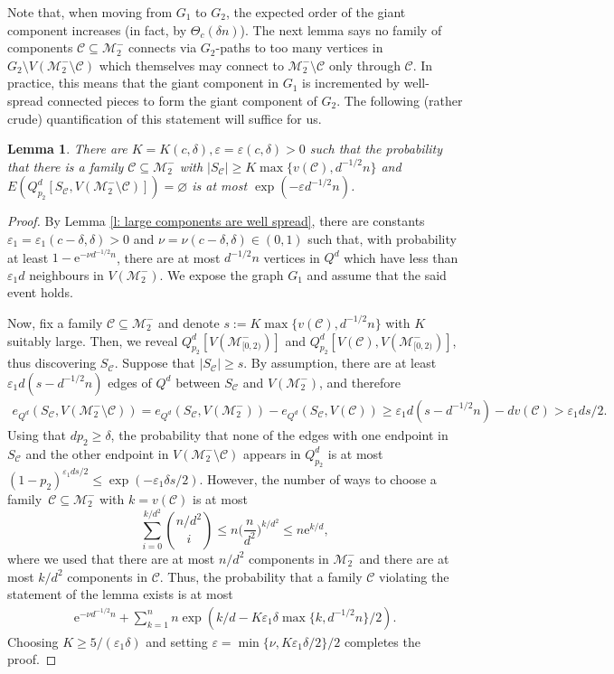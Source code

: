 \documentclass[reqno,final,a4paper]{amsart}
\newtheorem{lemma}[thm]{Lemma}
\theoremstyle{definition}
\newcommand{\cC}{\mathcal{C}}
\newcommand{\cM}{\mathcal{M}}
\def\e{\mathrm{e}}
\def\eps{\varepsilon}
\newcommand{\1}{\mathbbm{1}}
\begin{document}
Note that, when moving from $G_1$ to $G_2$, the expected order of the giant component increases (in fact, by $\Theta_c(\delta n)$). 
The next lemma says no family of components $\cC\subseteq \cM_2^-$ connects via $G_2$-paths to too many vertices in $G_2\setminus V(\cM_2^-\setminus \cC)$ which themselves may connect to $\cM_2^-\setminus \cC$ only through $\cC$. 
In practice, this means that the giant component in $G_1$ is incremented by well-spread connected pieces to form the giant component of $G_2$.
The following (rather crude) quantification of this statement will suffice for us. 
\begin{lemma}\label{l: no explosions}
There are $K=K(c,\delta), \eps = \eps(c,\delta)>0$ such that the probability that there is a family $\cC\subseteq \cM_2^-$ with $|S_{\cC}|\ge K\max\{v(\cC),d^{-1/2}n\}$ and $E(Q^d_{p_2}[S_{\cC},V(\cM_2^-\setminus \cC)])=\varnothing$ is at most $\exp(-\eps d^{-1/2} n)$.
\end{lemma}
\begin{proof}
By Lemma \ref{l: large components are well spread}, there are constants $\eps_1 = \eps_1(c-\delta,\delta)>0$ and $\nu=\nu(c-\delta,\delta)\in (0,1)$ such that, with probability at least $1-\e^{-\nu d^{-1/2} n}$, there are at most $d^{-1/2}n$ vertices in $Q^d$ which have less than $\eps_1 d$ neighbours in $V(\cM_2^-)$. We expose the graph $G_1$ and assume that the said event holds. 

Now, fix a family $\cC\subseteq \cM_2^-$ and denote $s:=K\max\{v(\cC),d^{-1/2}n\}$ with $K$ suitably large. Then, we reveal $Q^d_{p_2}[V(\cM_{[0,2)}^-)]$ and $Q^d_{p_2}[V(\cC),V(\cM_{[0,2)}^-)]$, thus discovering $S_{\cC}$. 
Suppose that $|S_{\cC}|\ge s$. By assumption, there are at least $\eps_1 d(s-d^{-1/2}n)$ edges of $Q^d$ between $S_{\cC}$ and $V(\cM_2^-)$, and therefore
\begin{align*}
    e_{Q^d}(S_{\cC}, V(\cM_2^-\setminus\cC)) = e_{Q^d}(S_{\cC}, V(\cM_2^-))-e_{Q^d}(S_{\cC}, V(\cC))\ge \eps_1 d(s-d^{-1/2}n)-dv(\cC)>\eps_1 ds/2.
\end{align*}
Using that $dp_2\ge \delta$, the probability that none of the edges with one endpoint in $S_{\cC}$ and the other endpoint in $V(\cM_2^-\setminus\cC)$ appears in $Q^d_{p_2}$ is at most $(1-p_2)^{\eps_1 ds/2}\le \exp(-\eps_1 \delta s/2)$. 
However, the number of ways to choose a family~$\cC\subseteq \cM_2^-$ with $k=v(\cC)$ is at most
\[\sum_{i=0}^{k/d^2} \binom{n/d^2}{i}\le n \bigg(\frac{n}{d^2}\bigg)^{k/d^2}\le n \e^{k/d},\]
where we used that there are at most $n/d^2$ components in $\cM_2^-$ and there are at most $k/d^2$ components in $\mathcal{C}$.
Thus, the probability that a family $\cC$ violating the statement of the lemma exists is at most 
\begin{align*}
    \e^{-\nu d^{-1/2}n}+\sum_{k=1}^{n}n\exp(k/d-K \eps_1 \delta \max\{k,d^{-1/2}n\}/2).
\end{align*}
Choosing $K \ge 5/(\eps_1 \delta)$ and setting $\eps=\min\{\nu,K\eps_1\delta/2\}/2$ completes the proof. 
\end{proof}
\end{document}
